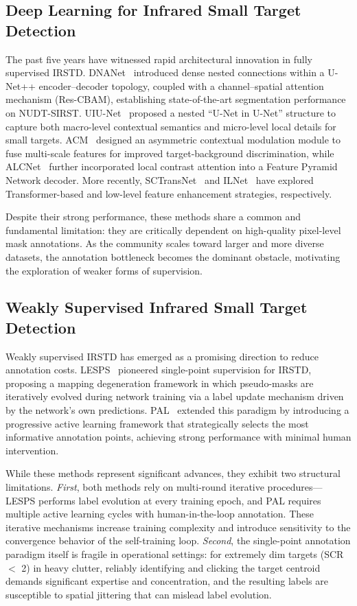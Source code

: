 \subsection{Deep Learning for Infrared Small Target Detection}\label{sec:related_dl}

The past five years have witnessed rapid architectural innovation in fully supervised IRSTD.
DNANet~\cite{dnanet} introduced dense nested connections within a U-Net++ encoder--decoder topology, coupled with a channel--spatial attention mechanism (Res-CBAM), establishing state-of-the-art segmentation performance on NUDT-SIRST.
UIU-Net~\cite{uiunet} proposed a nested ``U-Net in U-Net'' structure to capture both macro-level contextual semantics and micro-level local details for small targets.
ACM~\cite{acm} designed an asymmetric contextual modulation module to fuse multi-scale features for improved target-background discrimination, while ALCNet~\cite{alcnet} further incorporated local contrast attention into a Feature Pyramid Network decoder.
More recently, SCTransNet~\cite{sctransnet} and ILNet~\cite{ilnet} have explored Transformer-based and low-level feature enhancement strategies, respectively.

Despite their strong performance, these methods share a common and fundamental limitation: they are critically dependent on high-quality pixel-level mask annotations.
As the community scales toward larger and more diverse datasets, the annotation bottleneck becomes the dominant obstacle, motivating the exploration of weaker forms of supervision.

\subsection{Weakly Supervised Infrared Small Target Detection}\label{sec:related_ws}

Weakly supervised IRSTD has emerged as a promising direction to reduce annotation costs.
LESPS~\cite{lesps} pioneered single-point supervision for IRSTD, proposing a mapping degeneration framework in which pseudo-masks are iteratively evolved during network training via a label update mechanism driven by the network's own predictions.
PAL~\cite{pal} extended this paradigm by introducing a progressive active learning framework that strategically selects the most informative annotation points, achieving strong performance with minimal human intervention.

While these methods represent significant advances, they exhibit two structural limitations.
\emph{First}, both methods rely on multi-round iterative procedures---LESPS performs label evolution at every training epoch, and PAL requires multiple active learning cycles with human-in-the-loop annotation.
These iterative mechanisms increase training complexity and introduce sensitivity to the convergence behavior of the self-training loop.
\emph{Second}, the single-point annotation paradigm itself is fragile in operational settings: for extremely dim targets (SCR $<$ 2) in heavy clutter, reliably identifying and clicking the target centroid demands significant expertise and concentration, and the resulting labels are susceptible to spatial jittering that can mislead label evolution.

